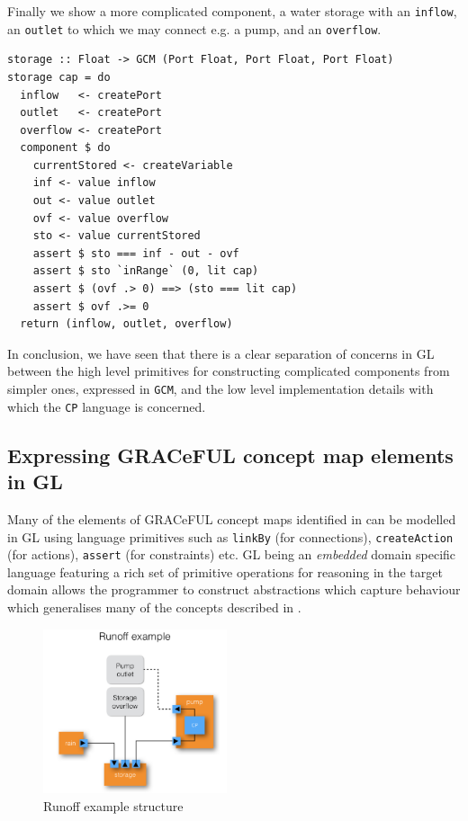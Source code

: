 Finally we show a more complicated component, a water storage with
an \texttt{inflow}, an \texttt{outlet} to which we may connect e.g. a pump,
and an \texttt{overflow}.
\begin{verbatim}
storage :: Float -> GCM (Port Float, Port Float, Port Float)
storage cap = do
  inflow   <- createPort
  outlet   <- createPort
  overflow <- createPort
  component $ do
    currentStored <- createVariable
    inf <- value inflow
    out <- value outlet
    ovf <- value overflow
    sto <- value currentStored
    assert $ sto === inf - out - ovf
    assert $ sto `inRange` (0, lit cap)
    assert $ (ovf .> 0) ==> (sto === lit cap)
    assert $ ovf .>= 0
  return (inflow, outlet, overflow)
\end{verbatim}

In conclusion, we have seen that there is a clear separation of concerns in GL between
the high level primitives for constructing complicated components from
simpler ones, expressed in \texttt{GCM}, and the low level
implementation details with which the \texttt{CP} language is
concerned.

\subsection{Expressing GRACeFUL concept map elements in GL}
Many of the elements of GRACeFUL concept maps identified in
\cite{D4.1} can be modelled in GL using language primitives such as
\texttt{linkBy} (for connections), \texttt{createAction} (for
actions), \texttt{assert} (for constraints) etc.
GL being an \textit{embedded} domain specific language featuring a
rich set of primitive operations for reasoning in the target domain
allows the programmer to construct abstractions which capture
behaviour which generalises many of the concepts described in
\cite{D4.1}.
%
\begin{figure}
  \centering
\includegraphics[width=0.48\textwidth]{fig/RunoffExample.jpg}
  \caption{Runoff example structure}
  \label{fig:RunoffEx}
\end{figure}
%
